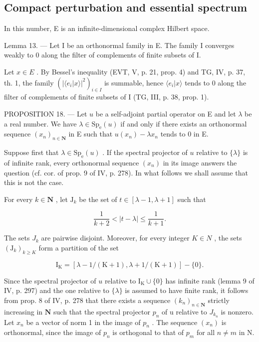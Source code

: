 \subsection{Compact perturbation and essential spectrum}

In this number, E is an infinite-dimensional complex Hilbert space.

Lemma 13. --- Let I be an orthonormal family in E. The family I converges weakly to 0 along the filter of complements of finite subsets of I.

Let \(x \in E\) . By Bessel's inequality (EVT, V, p. 21, prop. 4) and TG, IV, p. 37, th. 1, the family \((|\langle e_{i} | x\rangle|^{2})_{i\in I}\) is summable, hence \(\langle e_{i} | x\rangle\) tends to 0 along the filter of complements of finite subsets of I (TG, III, p. 38, prop. 1).

PROPOSITION 18. --- Let \(u\) be a self-adjoint partial operator on E and let \(\lambda\) be a real number. We have \(\lambda \in \mathrm{Sp}_{\mathrm{e}}(u)\) if and only if there exists an orthonormal sequence \((x_{n})_{n \in \mathbf{N}}\) in E such that \(u(x_{n}) - \lambda x_{n}\) tends to 0 in E.

Suppose first that \(\lambda \in \mathrm{Sp}_{\mathrm{e}}(u)\) . If the spectral projector of \(u\) relative to \(\{\lambda\}\) is of infinite rank, every orthonormal sequence \((x_{n})\) in its image answers the question (cf. cor. of prop. 9 of IV, p. 278). In what follows we shall assume that this is not the case.

For every \(k \in \mathbf{N}\) , let \(\mathrm{J}_k\) be the set of \(t \in [\lambda - 1, \lambda + 1]\) such that

\[
{\frac {1}{k + 2}} <   | t - \lambda | \leqslant {\frac {1}{k + 1}}.
\]

The sets \(J_{k}\) are pairwise disjoint. Moreover, for every integer \(K \in N\) , the sets \((\mathrm{J}_{k})_{k \geqslant K}\) form a partition of the set

\[
\mathrm{I} _ {\mathrm{K}} = [ \lambda - 1 / (\mathrm{K} + 1), \lambda + 1 / (\mathrm{K} + 1) ] - \{0 \}.
\]

Since the spectral projector of \(u\) relative to \(\mathrm{I_K} \cup \{0\}\) has infinite rank (lemma 9 of IV, p. 297) and the one relative to \(\{\lambda\}\) is assumed to have finite rank, it follows from prop. 8 of IV, p. 278 that there exists a sequence \((k_n)_{n \in \mathbf{N}}\) strictly increasing in \(\mathbf{N}\) such that the spectral projector \(p_{n}\) of u relative to \(J_{k_{n}}\) is nonzero. Let \(x_{n}\) be a vector of norm 1 in the image of \(p_{n}\) . The sequence \((x_{n})\) is orthonormal, since the image of \(p_{n}\) is orthogonal to that of \(p_{m}\) for all \(n \neq m\) in N.

